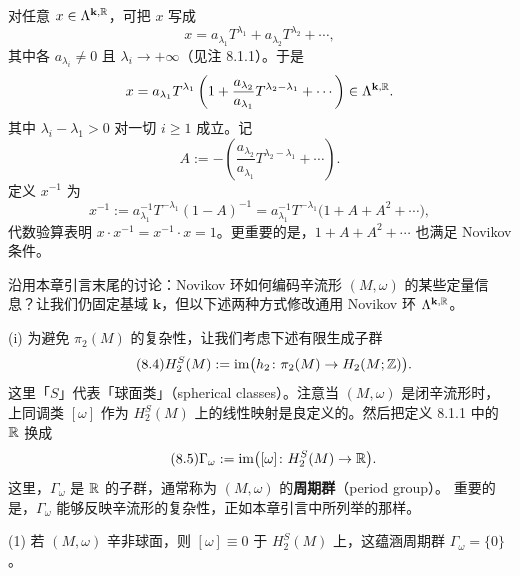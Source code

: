 \begin{wproof}
  对任意 $x\in\Lambda^{\mathbf{k},\mathbb{R}}$，可把 $x$ 写成
  \[
    x=a_{\lambda_1}T^{\lambda_1}+a_{\lambda_2}T^{\lambda_2}+\cdots,
  \]
  其中各 $a_{\lambda_i}\ne0$ 且 $\lambda_i\to+\infty$（见注 8.1.1）。于是
  \[
    x=a_{\lambda_1}T^{\lambda_1}
      \left(1+\frac{a_{\lambda_2}}{a_{\lambda_1}}T^{\lambda_2-\lambda_1}+\cdots\right)
      \in\Lambda^{\mathbf{k},\mathbb{R}}.
  \]
  其中 $\lambda_i-\lambda_1>0$ 对一切 $i\geqslant1$ 成立。记
  \[
    A:=-\left(\frac{a_{\lambda_2}}{a_{\lambda_1}}T^{\lambda_2-\lambda_1}+\cdots\right).
  \]
  定义 $x^{-1}$ 为
  \[
    x^{-1}:=a_{\lambda_1}^{-1}T^{-\lambda_1}(1-A)^{-1}
      =a_{\lambda_1}^{-1}T^{-\lambda_1}\bigl(1+A+A^2+\cdots\bigr),
  \]
  代数验算表明 $x\cdot x^{-1}=x^{-1}\cdot x=1$。更重要的是，$1+A+A^2+\cdots$ 也满足
  Novikov 条件。
\end{wproof}

沿用本章引言末尾的讨论：Novikov 环如何编码辛流形 $(M,\omega)$ 的某些定量信息？让我们仍固定基域
$\mathbf{k}$，但以下述两种方式修改通用 Novikov 环 $\Lambda^{\mathbf{k},\mathbb{R}}$。

(i) 为避免 $\pi_2(M)$ 的复杂性，让我们考虑下述有限生成子群
\begin{equation}\tag{8.4}
  H_2^S(M):=\operatorname{im}\bigl(h_2\colon\pi_2(M)\to H_2(M;\mathbb{Z})\bigr).
\end{equation}
这里「$S$」代表「球面类」（spherical classes）。注意当 $(M,\omega)$ 是闭辛流形时，上同调类
$[\omega]$ 作为 $H_2^S(M)$ 上的线性映射是良定义的。然后把定义 8.1.1 中的 $\mathbb{R}$ 换成
\begin{equation}\tag{8.5}
  \Gamma_\omega:=\operatorname{im}\bigl([\omega]\colon H_2^S(M)\to\mathbb{R}\bigr).
\end{equation}
这里，$\Gamma_\omega$ 是 $\mathbb{R}$ 的子群，通常称为 $(M,\omega)$ 的\textbf{周期群}（period group）。
重要的是，$\Gamma_\omega$ 能够反映辛流形的复杂性，正如本章引言中所列举的那样。

(1) 若 $(M,\omega)$ 辛非球面，则 $[\omega]\equiv0$ 于 $H_2^S(M)$ 上，这蕴涵周期群
$\Gamma_\omega=\{0\}$。

